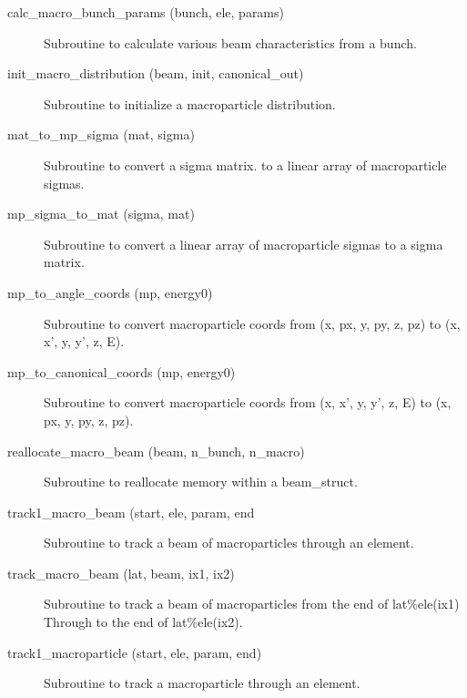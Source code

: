 \begin{description}

\label{r:calc.macro.bunch.params}
\item[calc_macro_bunch_params (bunch, ele, params)] \Newline
Subroutine to calculate various beam characteristics from a bunch.

\label{r:init.macro.distribution}
\item[init_macro_distribution (beam, init, canonical_out)] \Newline 
Subroutine to initialize a macroparticle distribution.

\label{r:mat.to.mp.sigma}
\item[mat_to_mp_sigma (mat, sigma)] \Newline 
Subroutine to convert a sigma matrix. to a linear array of 
macroparticle sigmas.

\label{r:mp.sigma.to.mat}
\item[mp_sigma_to_mat (sigma, mat)] \Newline 
Subroutine to convert a linear array of macroparticle sigmas to a 
sigma matrix. 

\label{r:mp.to.angle.coords}
\item[mp_to_angle_coords (mp, energy0)] \Newline 
Subroutine to convert macroparticle coords from 
(x, px, y, py, z, pz) to (x, x', y, y', z, E).

\label{r:mp.to.canonical.coords}
\item[mp_to_canonical_coords (mp, energy0)] \Newline 
Subroutine to convert macroparticle coords from 
(x, x', y, y', z, E) to (x, px, y, py, z, pz).

\label{r:reallocate.macro.beam}
\item[reallocate_macro_beam (beam, n_bunch, n_macro)] \Newline 
Subroutine to reallocate memory within a beam_struct.

\label{r:track1.macro.beam}
\item[track1_macro_beam (start, ele, param, end] \Newline
Subroutine to track a beam of macroparticles through an element.

\label{r:track.macro.beam}
\item[track_macro_beam (lat, beam, ix1, ix2)] \Newline 
Subroutine to track a beam of macroparticles from the end of
lat\%ele(ix1) Through to the end of lat\%ele(ix2).

\label{r:track1.macroparticle}
\item[track1_macroparticle (start, ele, param, end)] \Newline 
Subroutine to track a macroparticle through an element.

\end{description}

